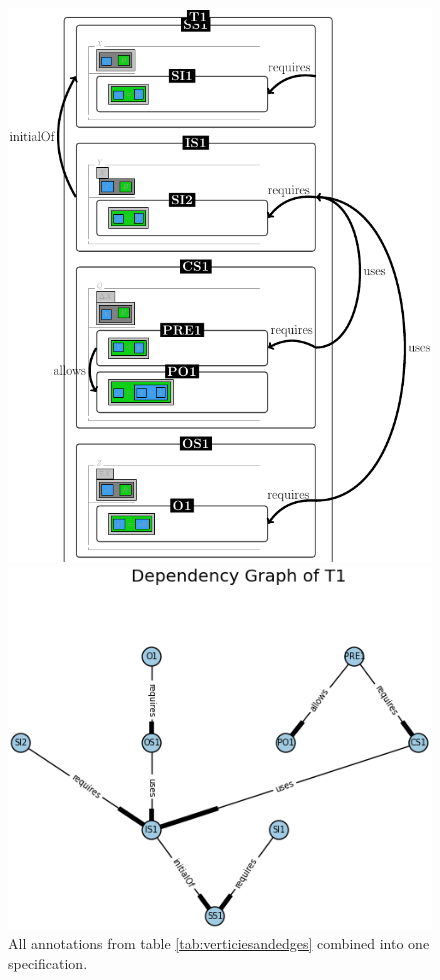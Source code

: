 \begin{figure}[H]
\centering
\begin{minipage}{0.45\textwidth}
\centering
\includegraphics[scale=0.18]{Figures/Formalising/draspec.png}
\caption{All annotations from table \ref{tab:verticiesandedges} combined into one specification.  \label{fig:draspec}}
\end{minipage}\hfill
\begin{minipage}{0.5\textwidth}
\centering
\includegraphics[scale=0.5]{Figures/Formalising/dp_text.png}

\end{minipage}
\end{figure}
